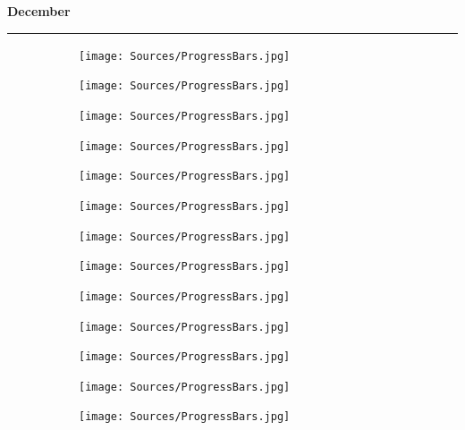  \hfill \sffamily\textbf{\fontsize{16}{20}\selectfont December} \par
\rule{\linewidth}{0.1cm} \par

\begin{figure}[H]
    \begin{subfigure}[l]{23pt}
        \texttt{[image: Sources/ProgressBars.jpg]}
    \end{subfigure}
    \begin{subfigure}[l]{23pt}
        \texttt{[image: Sources/ProgressBars.jpg]}
    \end{subfigure}
    \begin{subfigure}[l]{23pt}
        \texttt{[image: Sources/ProgressBars.jpg]}
    \end{subfigure}
    \begin{subfigure}[l]{23pt}
        \texttt{[image: Sources/ProgressBars.jpg]}
    \end{subfigure}
    \begin{subfigure}[l]{23pt}
        \texttt{[image: Sources/ProgressBars.jpg]}
    \end{subfigure}
    \begin{subfigure}[l]{23pt}
        \texttt{[image: Sources/ProgressBars.jpg]}
    \end{subfigure}
    \begin{subfigure}[l]{23pt}
        \texttt{[image: Sources/ProgressBars.jpg]}
    \end{subfigure}
    \begin{subfigure}[l]{23pt}
        \texttt{[image: Sources/ProgressBars.jpg]}
    \end{subfigure}
    \begin{subfigure}[l]{23pt}
        \texttt{[image: Sources/ProgressBars.jpg]}
    \end{subfigure}
    \begin{subfigure}[l]{23pt}
        \texttt{[image: Sources/ProgressBars.jpg]}
    \end{subfigure}
    \begin{subfigure}[l]{23pt}
        \texttt{[image: Sources/ProgressBars.jpg]}
    \end{subfigure}
    \begin{subfigure}[l]{23pt}
        \texttt{[image: Sources/ProgressBars.jpg]}
    \end{subfigure}
    \begin{subfigure}[l]{23pt}
        \texttt{[image: Sources/ProgressBars.jpg]}
    \end{subfigure}
\end{figure}

